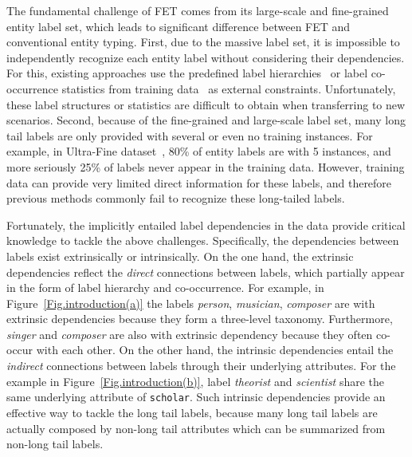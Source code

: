 \documentclass[11pt]{article}
\begin{document}
The fundamental challenge of FET comes from its large-scale and fine-grained entity label set, which leads to significant difference between FET and conventional entity typing. First, due to the massive label set, it is impossible to independently recognize each entity label without considering their dependencies. For this, existing approaches use the predefined label hierarchies~\citep{ren2016afet_hier1, DBLP:conf/eacl/InuiRSS17_shimaoka_hier7, DBLP:conf/eacl/AbhishekAA17_hier5, DBLP:conf/eacl/SchutzeWK17_hier8, XuandBarbosa2018neural_hier2, DBLP:conf/ijcai/WuZMGH19_hier3, DBLP:conf/acl/ChenCD20_onto_hier4, ren2020fine_inference_hier6} or label co-occurrence statistics from training data~\citep{DBLP:conf/acl/RabinovichK17_core1, xiong2019imposing_core2, linandJi2019attentive_core3} as external constraints. Unfortunately, these label structures or statistics are difficult to obtain when transferring to new scenarios. Second, because of the fine-grained and large-scale label set, many long tail labels are only provided with several or even no training instances. For example, in Ultra-Fine dataset~\citep{choi2018ultra_data1}, 80\% of entity labels are with 5 instances, and more seriously 25\% of labels never appear in the training data. However, training data can provide very limited direct information for these labels, and therefore previous methods commonly fail to recognize these long-tailed labels.

Fortunately, the implicitly entailed label dependencies in the data provide critical knowledge to tackle the above challenges. Specifically, the dependencies between labels exist extrinsically or intrinsically. On the one hand, the extrinsic dependencies reflect the \emph{direct} connections between labels, which partially appear in the form of label hierarchy and co-occurrence. For example, in Figure~\ref{Fig.introduction(a)} the labels \textit{person}, \textit{musician}, \textit{composer} are with extrinsic dependencies because they form a three-level taxonomy. Furthermore, \textit{singer} and  \textit{composer} are also with extrinsic dependency because they often co-occur with each other. On the other hand, the intrinsic dependencies entail the \emph{indirect} connections between labels through their underlying attributes. For the example in Figure~\ref{Fig.introduction(b)}, label \textit{theorist} and \textit{scientist} share the same underlying attribute of \texttt{scholar}. Such intrinsic dependencies provide an effective way to tackle the long tail labels, because many long tail labels are actually composed by non-long tail attributes which can be summarized  from non-long tail labels.
\end{document}
